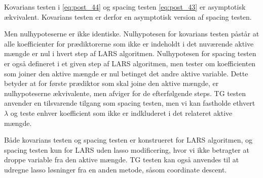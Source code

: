 Kovarians testen i \eqref{eq:post_44} og spacing testen \eqref{eq:post_43} er asymptotisk ækvivalent.
Kovarians testen er derfor en asymptotisk version af spacing testen.

Men nulhypoteserne er ikke identiske.
Nulhypotesen for kovarians testen påstår at alle koefficienter for prædiktorerne som ikke er indeholdt i det nuværende aktive mængde er nul i hvert step af LARS algoritmen.
Nulhypotesen for spacing testen er også defineret i et given step af LARS algoritmen, men tester om koefficienten som joiner den aktive mængde er nul betinget det andre aktive variable.
Dette betyder at for første prædiktor som skal joine den aktive mængde, er nulhypoteserne ækvivalente, men afviger for de efterfølgende steps.
TG testen anvender en tilsvarende tilgang som spacing testen, men vi kan fastholde ethvert \(\lambda\) og teste enhver koefficient som ikke er indkluderet i det relateret aktive mængde.

Både kovarians testen og spacing testen er konstrueret for LARS algoritmen, og spacing testen kun for LARS uden lasso modificering, hvor vi ikke betragter at droppe variable fra den aktive mængde. TG testen kan også anvendes til at udregne lasso løsninger fra en anden metode, såsom coordinate descent.
